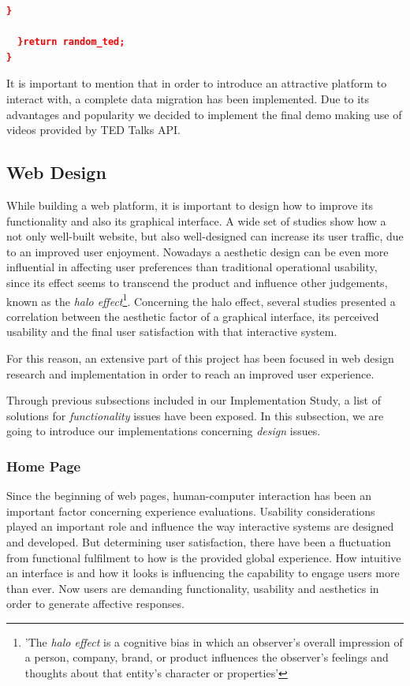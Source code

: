 \documentclass{acm_proc_article-sp}
\begin{document}
\begin{lstlisting}[language=json,firstnumber=1]
      }
      
  }return random_ted; 
}
\end{lstlisting}

It is important to mention that in order to introduce an attractive platform to interact with, a complete data migration has been implemented. Due to its advantages and popularity we decided to implement the final demo making use of videos provided by TED Talks API\cite{cettolo2012wit3}.

\subsection{Web Design}
While building a web platform, it is important to design how to improve its functionality and also its graphical interface. A wide set of studies \cite{allen2012smashing} show how a not only well-built website, but also well-designed can increase its user traffic, due to an improved user enjoyment. Nowadays a aesthetic design 
can be even more influential in affecting user preferences 
than traditional operational usability, since its effect seems to transcend the product and influence other judgements, known as the \textit{halo effect}\cite{de2006interaction}\cite{wiki:halo}\footnote{'The \textit{halo effect} is a cognitive bias in which an observer's overall impression of a person, company, brand, or product influences the observer's feelings and thoughts about that entity's character or properties'}. Concerning the halo effect, several studies \cite{de2006interaction} presented a correlation between the aesthetic factor of a graphical interface, its perceived usability and the final user satisfaction with that interactive system. 

For this reason, an extensive part of this project has been focused in web design research and implementation in order to reach an improved user experience. 

Through previous subsections included in our Implementation Study, a list of solutions for \textit{functionality} issues have been exposed. In this subsection, we are going to introduce our implementations concerning \textit{design} issues. 

\subsubsection{Home Page}
Since the beginning of web pages, human-computer interaction has been an important factor concerning experience evaluations\cite{monk2004product}. Usability considerations played an important role and influence the way interactive systems are designed and developed\cite{green2003pleasure}. But determining user satisfaction, there have been a  fluctuation from functional fulfilment to how is the provided global experience\cite{de2006interaction}. How intuitive an interface is and how it looks is influencing the capability to engage users more than ever\cite{allen2012smashing}. Now users are demanding functionality, usability and aesthetics in order to generate affective responses. 
\end{document}

